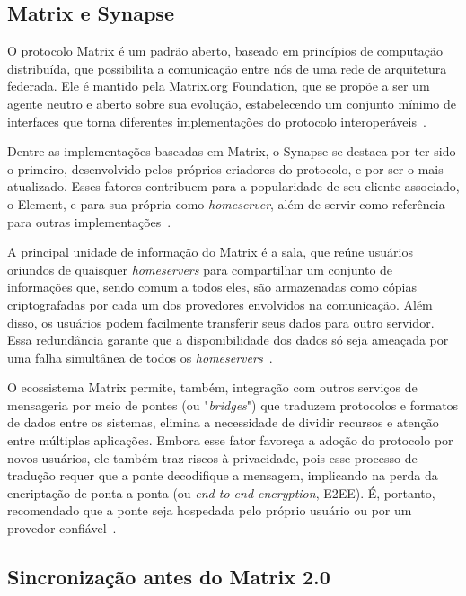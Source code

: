 \subsection{Matrix e Synapse}

	O protocolo Matrix é um padrão aberto, baseado em princípios de computação distribuída, que possibilita a comunicação entre nós de uma rede de arquitetura federada. Ele é mantido pela Matrix.org Foundation, que se propõe a ser um agente neutro e aberto sobre sua evolução, estabelecendo um conjunto mínimo de interfaces que torna diferentes implementações do protocolo interoperáveis~\parencite{matrixorg-about}.

	Dentre as implementações baseadas em Matrix, o Synapse se destaca por ter sido o primeiro, desenvolvido pelos próprios criadores do protocolo, e por ser o mais atualizado. Esses fatores contribuem para a popularidade de seu cliente associado, o Element, e para sua própria como \textit{homeserver}, além de servir como referência para outras implementações~\parencite{matrixorg-element-relationship}.

	A principal unidade de informação do Matrix é a sala, que reúne usuários oriundos de quaisquer \textit{homeservers} para compartilhar um conjunto de informações que, sendo comum a todos eles, são armazenadas como cópias criptografadas por cada um dos provedores envolvidos na comunicação. Além disso, os usuários podem facilmente transferir seus dados para outro servidor. Essa redundância garante que a disponibilidade dos dados só seja ameaçada por uma falha simultânea de todos os \textit{homeservers}~\parencite{matrixorg-rooms}.

	O ecossistema Matrix permite, também, integração com outros serviços de mensageria por meio de pontes (ou "\textit{bridges}") que traduzem protocolos e formatos de dados entre os sistemas, elimina a necessidade de dividir recursos e atenção entre múltiplas aplicações. Embora esse fator favoreça a adoção do protocolo por novos usuários, ele também traz riscos à privacidade, pois esse processo de tradução requer que a ponte decodifique a mensagem, implicando na perda da encriptação de ponta-a-ponta (ou \textit{end-to-end encryption}, E2EE). É, portanto, recomendado que a ponte seja hospedada pelo próprio usuário ou por um provedor confiável~\parencite{matrixorg-bridges}.

\subsection{Sincronização antes do Matrix 2.0}
		
